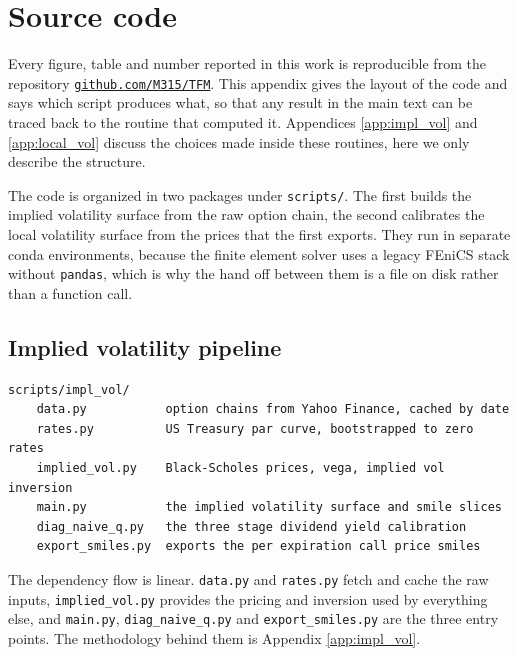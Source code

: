 
\chapter{Source code}
\label{app:code}

Every figure, table and number reported in this work is reproducible from the repository
\href{https://github.com/M315/TFM}{\texttt{github.com/M315/TFM}}.
This appendix gives the layout of the code and says which script produces what,
so that any result in the main text can be traced back to the routine that computed it.
Appendices \ref{app:impl_vol} and \ref{app:local_vol} discuss the choices made inside these
routines, here we only describe the structure.

The code is organized in two packages under \texttt{scripts/}.
The first builds the implied volatility surface from the raw option chain,
the second calibrates the local volatility surface from the prices that the first exports.
They run in separate conda environments,
because the finite element solver uses a legacy FEniCS stack without \texttt{pandas},
which is why the hand off between them is a file on disk rather than a function call.

\section{Implied volatility pipeline}
\label{subsec:code_impl_vol}

\begin{verbatim}
scripts/impl_vol/
    data.py           option chains from Yahoo Finance, cached by date
    rates.py          US Treasury par curve, bootstrapped to zero rates
    implied_vol.py    Black-Scholes prices, vega, implied vol inversion
    main.py           the implied volatility surface and smile slices
    diag_naive_q.py   the three stage dividend yield calibration
    export_smiles.py  exports the per expiration call price smiles
\end{verbatim}

The dependency flow is linear.
\texttt{data.py} and \texttt{rates.py} fetch and cache the raw inputs,
\texttt{implied\_vol.py} provides the pricing and inversion used by everything else,
and \texttt{main.py}, \texttt{diag\_naive\_q.py} and \texttt{export\_smiles.py} are the three
entry points.
The methodology behind them is Appendix \ref{app:impl_vol}.

